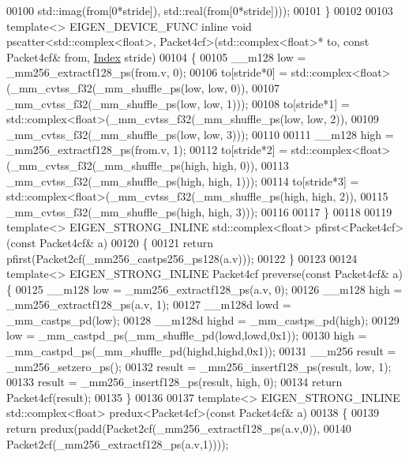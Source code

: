 \begin{DoxyCode}
00100                                  std::imag(from[0*stride]), std::real(from[0*stride])));
00101 \}
00102 
00103 \textcolor{keyword}{template}<> EIGEN\_DEVICE\_FUNC \textcolor{keyword}{inline} \textcolor{keywordtype}{void} pscatter<std::complex<float>, Packet4cf>(std::complex<float>* to, \textcolor{keyword}{
      const} Packet4cf& from, \hyperlink{namespace_eigen_a62e77e0933482dafde8fe197d9a2cfde}{Index} stride)
00104 \{
00105   \_\_m128 low = \_mm256\_extractf128\_ps(from.v, 0);
00106   to[stride*0] = std::complex<float>(\_mm\_cvtss\_f32(\_mm\_shuffle\_ps(low, low, 0)),
00107                                      \_mm\_cvtss\_f32(\_mm\_shuffle\_ps(low, low, 1)));
00108   to[stride*1] = std::complex<float>(\_mm\_cvtss\_f32(\_mm\_shuffle\_ps(low, low, 2)),
00109                                      \_mm\_cvtss\_f32(\_mm\_shuffle\_ps(low, low, 3)));
00110 
00111   \_\_m128 high = \_mm256\_extractf128\_ps(from.v, 1);
00112   to[stride*2] = std::complex<float>(\_mm\_cvtss\_f32(\_mm\_shuffle\_ps(high, high, 0)),
00113                                      \_mm\_cvtss\_f32(\_mm\_shuffle\_ps(high, high, 1)));
00114   to[stride*3] = std::complex<float>(\_mm\_cvtss\_f32(\_mm\_shuffle\_ps(high, high, 2)),
00115                                      \_mm\_cvtss\_f32(\_mm\_shuffle\_ps(high, high, 3)));
00116 
00117 \}
00118 
00119 \textcolor{keyword}{template}<> EIGEN\_STRONG\_INLINE std::complex<float>  pfirst<Packet4cf>(\textcolor{keyword}{const} Packet4cf& a)
00120 \{
00121   \textcolor{keywordflow}{return} pfirst(Packet2cf(\_mm256\_castps256\_ps128(a.v)));
00122 \}
00123 
00124 \textcolor{keyword}{template}<> EIGEN\_STRONG\_INLINE Packet4cf preverse(\textcolor{keyword}{const} Packet4cf& a) \{
00125   \_\_m128 low  = \_mm256\_extractf128\_ps(a.v, 0);
00126   \_\_m128 high = \_mm256\_extractf128\_ps(a.v, 1);
00127   \_\_m128d lowd  = \_mm\_castps\_pd(low);
00128   \_\_m128d highd = \_mm\_castps\_pd(high);
00129   low  = \_mm\_castpd\_ps(\_mm\_shuffle\_pd(lowd,lowd,0x1));
00130   high = \_mm\_castpd\_ps(\_mm\_shuffle\_pd(highd,highd,0x1));
00131   \_\_m256 result = \_mm256\_setzero\_ps();
00132   result = \_mm256\_insertf128\_ps(result, low, 1);
00133   result = \_mm256\_insertf128\_ps(result, high, 0);
00134   \textcolor{keywordflow}{return} Packet4cf(result);
00135 \}
00136 
00137 \textcolor{keyword}{template}<> EIGEN\_STRONG\_INLINE std::complex<float> predux<Packet4cf>(\textcolor{keyword}{const} Packet4cf& a)
00138 \{
00139   \textcolor{keywordflow}{return} predux(padd(Packet2cf(\_mm256\_extractf128\_ps(a.v,0)),
00140                      Packet2cf(\_mm256\_extractf128\_ps(a.v,1))));

\end{DoxyCode}
